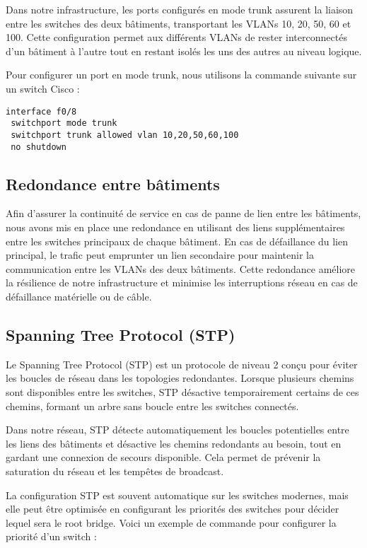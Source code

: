 \documentclass[a4paper,12pt]{report}
\begin{document}
Dans notre infrastructure, les ports configurés en mode trunk assurent la liaison entre les switches des deux bâtiments, transportant les VLANs 10, 20, 50, 60 et 100. Cette configuration permet aux différents VLANs de rester interconnectés d'un bâtiment à l'autre tout en restant isolés les uns des autres au niveau logique. 

Pour configurer un port en mode trunk, nous utilisons la commande suivante sur un switch Cisco :

\begin{verbatim}
interface f0/8
 switchport mode trunk
 switchport trunk allowed vlan 10,20,50,60,100
 no shutdown
\end{verbatim}

\subsection{Redondance entre bâtiments}
Afin d'assurer la continuité de service en cas de panne de lien entre les bâtiments, nous avons mis en place une redondance en utilisant des liens supplémentaires entre les switches principaux de chaque bâtiment. En cas de défaillance du lien principal, le trafic peut emprunter un lien secondaire pour maintenir la communication entre les VLANs des deux bâtiments. Cette redondance améliore la résilience de notre infrastructure et minimise les interruptions réseau en cas de défaillance matérielle ou de câble.

\subsection{Spanning Tree Protocol (STP)}
Le Spanning Tree Protocol (STP) est un protocole de niveau 2 conçu pour éviter les boucles de réseau dans les topologies redondantes. Lorsque plusieurs chemins sont disponibles entre les switches, STP désactive temporairement certains de ces chemins, formant un arbre sans boucle entre les switches connectés. 

Dans notre réseau, STP détecte automatiquement les boucles potentielles entre les liens des bâtiments et désactive les chemins redondants au besoin, tout en gardant une connexion de secours disponible. Cela permet de prévenir la saturation du réseau et les tempêtes de broadcast.

La configuration STP est souvent automatique sur les switches modernes, mais elle peut être optimisée en configurant les priorités des switches pour décider lequel sera le root bridge. Voici un exemple de commande pour configurer la priorité d'un switch :
\end{document}
